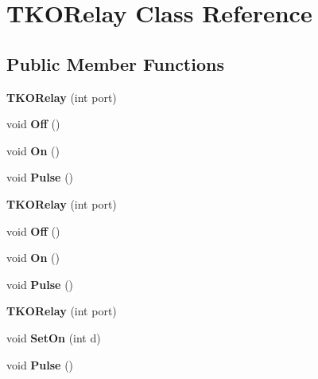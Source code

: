 \hypertarget{class_t_k_o_relay}{\section{T\-K\-O\-Relay Class Reference}
\label{class_t_k_o_relay}
}
\subsection*{Public Member Functions}
\begin{DoxyCompactItemize}
\item 
\hypertarget{class_t_k_o_relay_a185407021ca76d02fc2d34c1c05fc813}{{\bfseries T\-K\-O\-Relay} (int port)}\label{class_t_k_o_relay_a185407021ca76d02fc2d34c1c05fc813}

\item 
\hypertarget{class_t_k_o_relay_a93e5e86561bbedcd49ff049fbb91905c}{void {\bfseries Off} ()}\label{class_t_k_o_relay_a93e5e86561bbedcd49ff049fbb91905c}

\item 
\hypertarget{class_t_k_o_relay_aa5c59a5e42d05d1a5ea65372e63d7d44}{void {\bfseries On} ()}\label{class_t_k_o_relay_aa5c59a5e42d05d1a5ea65372e63d7d44}

\item 
\hypertarget{class_t_k_o_relay_a7f4c94b16dc33d4165410d83ef01e191}{void {\bfseries Pulse} ()}\label{class_t_k_o_relay_a7f4c94b16dc33d4165410d83ef01e191}

\item 
\hypertarget{class_t_k_o_relay_a185407021ca76d02fc2d34c1c05fc813}{{\bfseries T\-K\-O\-Relay} (int port)}\label{class_t_k_o_relay_a185407021ca76d02fc2d34c1c05fc813}

\item 
\hypertarget{class_t_k_o_relay_a93e5e86561bbedcd49ff049fbb91905c}{void {\bfseries Off} ()}\label{class_t_k_o_relay_a93e5e86561bbedcd49ff049fbb91905c}

\item 
\hypertarget{class_t_k_o_relay_aa5c59a5e42d05d1a5ea65372e63d7d44}{void {\bfseries On} ()}\label{class_t_k_o_relay_aa5c59a5e42d05d1a5ea65372e63d7d44}

\item 
\hypertarget{class_t_k_o_relay_a7f4c94b16dc33d4165410d83ef01e191}{void {\bfseries Pulse} ()}\label{class_t_k_o_relay_a7f4c94b16dc33d4165410d83ef01e191}

\item 
\hypertarget{class_t_k_o_relay_a185407021ca76d02fc2d34c1c05fc813}{{\bfseries T\-K\-O\-Relay} (int port)}\label{class_t_k_o_relay_a185407021ca76d02fc2d34c1c05fc813}

\item 
\hypertarget{class_t_k_o_relay_a03b62b4248237ccf41ea9abe5e2df746}{void {\bfseries Set\-On} (int d)}\label{class_t_k_o_relay_a03b62b4248237ccf41ea9abe5e2df746}

\item 
\hypertarget{class_t_k_o_relay_a7f4c94b16dc33d4165410d83ef01e191}{void {\bfseries Pulse} ()}\label{class_t_k_o_relay_a7f4c94b16dc33d4165410d83ef01e191}

\end{DoxyCompactItemize}


